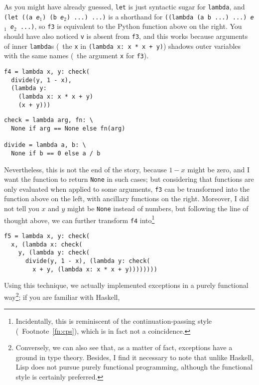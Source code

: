 As you might have already guessed, \verb|let| is just syntactic sugar for
\verb|lambda|, and \texttt{(let ((a \emph{e$_1$}) (b \emph{e$_2$}) ...) ...)}
is a shorthand for \texttt{((lambda (a b ...) ...) \emph{e$_1$} \emph{e$_2$}
...)}, so \verb|f3| is equivalent to the Python function above on the right.
You should have also noticed \verb|v| is absent from \verb|f3|, and this
works because arguments of inner \verb|lambda|s (\eg~the \verb|x|
in \texttt{(lambda x: x * x + y)}) shadows outer variables with
the same names (\eg~the argument \verb|x| for \verb|f3|).

\colskipa\begin{multicols}{2}
\begin{quoting}
\begin{Verbatim}
f4 = lambda x, y: check(
  divide(y, 1 - x),
  (lambda y:
    (lambda x: x * x + y)
    (x + y)))
\end{Verbatim}
\end{quoting}
\begin{quoting}
\begin{Verbatim}
check = lambda arg, fn: \
  None if arg == None else fn(arg)

divide = lambda a, b: \
  None if b == 0 else a / b
\end{Verbatim}
\end{quoting}
\end{multicols}\colskipb
Nevertheless, this is not the end of the story, because $1 - x$ might
be zero, and I want the function to return \verb|None| in such cases;
but considering that functions are only evaluated when applied to some
arguments, \verb|f3| can be transformed into the function above on the left,
with ancillary functions on the right.  Moreover, I did not tell you $x$ and
$y$ might be \verb|None| instead of numbers, but following the line of thought
above, we can further transform \verb|f4| into\footnote{Incidentally, this is
reminiscent of the continuation-passing style (\cf~Footnote~\ref{fn:cps}),
which is in fact not a coincidence\cupercite{troelskn2009}.}
\begin{quoting}
\begin{Verbatim}
f5 = lambda x, y: check(
  x, (lambda x: check(
    y, (lambda y: check(
      divide(y, 1 - x), (lambda y: check(
        x + y, (lambda x: x * x + y))))))))
\end{Verbatim}
\end{quoting}
Using this technique, we actually implemented exceptions in a purely functional
way\footnote{Conversely, we can also see that, as a matter of fact, exceptions
have a ground in type theory.  Besides, I find it necessary to note that
unlike Haskell, Lisp does not pursue purely functional programming, although
the functional style is certainly preferred.}; if you are familiar with Haskell,
